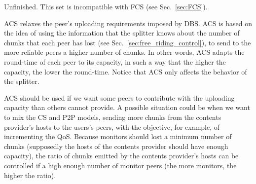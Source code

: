 
\label{sec:ACS}

\begin{notex}
  Unfinished. This set is incompatible with FCS (see
  Sec.~\ref{sec:FCS}).
\end{notex}

ACS relaxes the peer's uploading requirements imposed by DBS. ACS is
based on the idea of using the information that the splitter knows
about the number of chunks that each peer has lost (see
Sec.~\ref{sec:free_riding_control}), to send to the more reliable
peers a higher number of chunks. In other words, ACS adapts the
round-time of each peer to its capacity, in such a way that the higher
the capacity, the lower the \gls{round-time}. Notice that ACS only
affects the behavior of the splitter.


ACS should be used if we want some peers to contribute with the
uploading capacity than others cannot provide. A possible situation
could be when we want to mix the CS and P2P models, sending more
chunks from the contents provider's hosts to the users's peers, with
the objective, for example, of incrementing the QoS. Because monitors
should lost a minimum number of chunks (supposedly the hosts of the
contents provider should have enough capacity), the ratio of chunks
emitted by the contents provider's hosts can be controlled if a high
enough number of monitor peers (the more monitors, the higher the
ratio).

